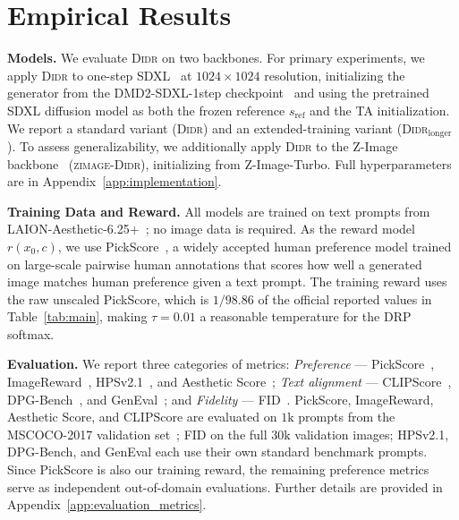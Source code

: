 \section{Empirical Results}
\vspace{-3mm}

\textbf{Models.}
We evaluate \textsc{Didr} on two backbones. For primary experiments, we apply \textsc{Didr} to one-step SDXL~\citep{podell2023sdxl} at $1024\times1024$ resolution, initializing the generator from the DMD2-SDXL-1step checkpoint~\citep{yin2024improved} and using the pretrained SDXL diffusion model as both the frozen reference $s_{\mathrm{ref}}$ and the TA initialization. We report a standard variant (\textsc{Didr}) and an extended-training variant (\textsc{Didr}$_{\text{longer}}$). To assess generalizability, we additionally apply \textsc{Didr} to the Z-Image backbone~\citep{zimage} (\textsc{zimage-Didr}), initializing from Z-Image-Turbo. Full hyperparameters are in Appendix~\ref{app:implementation}.

\textbf{Training Data and Reward.}
All models are trained on text prompts from LAION-Aesthetic-6.25+~\citep{zhou2024long}; no image data is required. As the reward model $r(x_0,c)$, we use PickScore~\citep{pickscore}, a widely accepted human preference model trained on large-scale pairwise human annotations that scores how well a generated image matches human preference given a text prompt. The training reward uses the raw unscaled PickScore, which is $1/98.86$ of the official reported values in Table~\ref{tab:main}, making $\tau{=}0.01$ a reasonable temperature for the DRP softmax.

\textbf{Evaluation.}
We report three categories of metrics: \textit{Preference} --- PickScore~\citep{pickscore}, ImageReward~\citep{xu2023imagereward}, HPSv2.1~\citep{hpsv2}, and Aesthetic Score~\citep{laionaes}; \textit{Text alignment} --- CLIPScore~\citep{hessel2021clipscore,radford2021learning}, DPG-Bench~\citep{dpgbench}, and GenEval~\citep{geneval}; and \textit{Fidelity} --- FID~\citep{heusel2017gans}. PickScore, ImageReward, Aesthetic Score, and CLIPScore are evaluated on $1\text{k}$ prompts from the MSCOCO-2017 validation set~\citep{lin2014microsoft}; FID on the full $30\text{k}$ validation images; HPSv2.1, DPG-Bench, and GenEval each use their own standard benchmark prompts. Since PickScore is also our training reward, the remaining preference metrics serve as independent out-of-domain evaluations. Further details are provided in Appendix~\ref{app:evaluation_metrics}.

